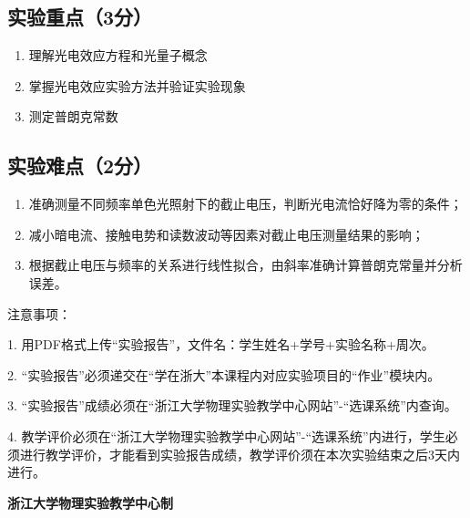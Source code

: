 \documentclass[10pt,a4paper]{ctexart} %
\begin{document}
  \subsection{实验重点（3分）}
  \begin{enumerate}
    \item 理解光电效应方程和光量子概念
    \item 掌握光电效应实验方法并验证实验现象
    \item 测定普朗克常数
  \end{enumerate}

  \subsection{实验难点（2分）}
  \begin{enumerate}
    \item 准确测量不同频率单色光照射下的截止电压，判断光电流恰好降为零的条件；
    \item 减小暗电流、接触电势和读数波动等因素对截止电压测量结果的影响；
    \item 根据截止电压与频率的关系进行线性拟合，由斜率准确计算普朗克常量并分析误差。
  \end{enumerate}

\vspace*{\fill} %
\noindent
\begin{minipage}{\textwidth}
  注意事项：

  \begingroup
    \setlength{\leftskip}{2em} %
    1. 用PDF格式上传“实验报告”，文件名：学生姓名+学号+实验名称+周次。

    2. “实验报告”必须递交在“学在浙大”本课程内对应实验项目的“作业”模块内。

    3. “实验报告”成绩必须在“浙江大学物理实验教学中心网站”-“选课系统”内查询。

    4. 教学评价必须在“浙江大学物理实验教学中心网站”-“选课系统”内进行，学生必须进行教学评价，才能看到实验报告成绩，教学评价须在本次实验结束之后3天内进行。\par
  \endgroup

  \begin{center}
    {\bfseries 浙江大学物理实验教学中心制}
  \end{center}
\end{minipage}
\end{document}
